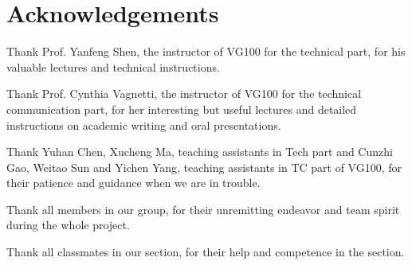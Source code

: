 \newpage
\section{Acknowledgements}

Thank Prof. Yanfeng Shen, the instructor of VG100 for the technical part, for
his valuable lectures and technical instructions. 

Thank Prof. Cynthia Vagnetti, the instructor of VG100 for the technical
communication part, for her interesting but useful lectures and detailed 
instructions on academic writing and oral presentations. 

Thank Yuhan Chen, Xucheng Ma, teaching assistants in Tech part and Cunzhi Gao,
Weitao Sun and Yichen Yang, teaching assistants in TC part of VG100, for their
patience and guidance when we are in trouble.

Thank all members in our group, for their unremitting endeavor and team spirit
during the whole project.

Thank all classmates in our section, for their help and competence in the
section.  